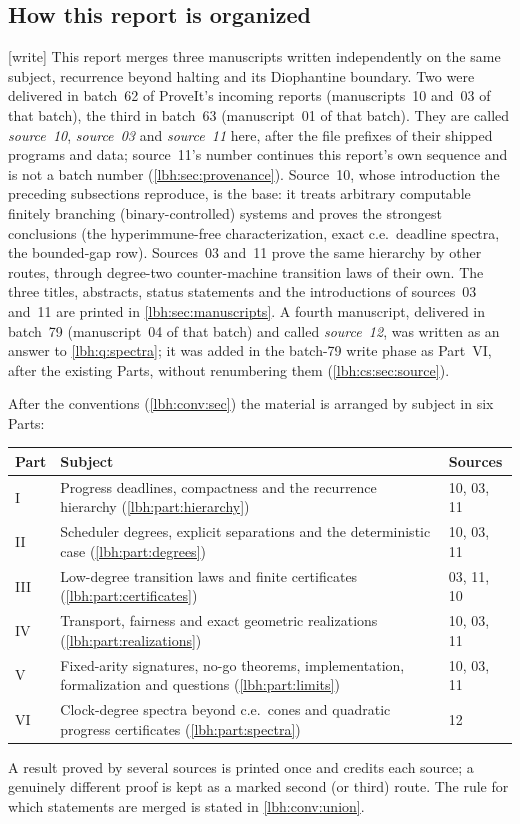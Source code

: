 \documentclass[11pt,letterpaper]{article}
\theoremstyle{definition}
\theoremstyle{remark}
\newcommand{\1}{\mathbf 1}
\newcommand{\wtag}{\textup{[write]}}%
\begin{document}
\subsection{How this report is organized}\label{lbh:sec:organization}
\wtag{} This report merges three manuscripts written independently on the same subject,
recurrence beyond halting and its Diophantine boundary. Two were delivered in batch~62 of
ProveIt's incoming reports (manuscripts~10 and~03 of that batch), the third in batch~63
(manuscript~01 of that batch). They are called \emph{source~10}, \emph{source~03} and
\emph{source~11} here, after the file prefixes of their shipped programs and data; source~11's
number continues this report's own sequence and is not a batch number
(\cref{lbh:sec:provenance}). Source~10, whose introduction the preceding subsections
reproduce, is the base: it treats arbitrary computable finitely branching (binary-controlled)
systems and proves the strongest conclusions (the hyperimmune-free characterization, exact
c.e.\ deadline spectra, the bounded-gap row). Sources~03 and~11 prove the same hierarchy by
other routes, through degree-two counter-machine transition laws of their own. The three titles,
abstracts, status statements and the introductions of sources~03 and~11 are printed in
\cref{lbh:sec:manuscripts}. A fourth manuscript, delivered in batch~79 (manuscript~04 of that
batch) and called \emph{source~12}, was written as an answer to \cref{lbh:q:spectra}; it was added
in the batch-79 write phase as Part~VI, after the existing Parts, without renumbering them
(\cref{lbh:cs:sec:source}).

After the conventions (\cref{lbh:conv:sec}) the material is arranged by subject in six Parts:
\begin{center}
\small
\begin{tabularx}{\textwidth}{@{}lXl@{}}
\toprule
Part & Subject & Sources\\
\midrule
I & Progress deadlines, compactness and the recurrence hierarchy (\cref{lbh:part:hierarchy}) & 10, 03, 11\\
II & Scheduler degrees, explicit separations and the deterministic case (\cref{lbh:part:degrees}) & 10, 03, 11\\
III & Low-degree transition laws and finite certificates (\cref{lbh:part:certificates}) & 03, 11, 10\\
IV & Transport, fairness and exact geometric realizations (\cref{lbh:part:realizations}) & 10, 03, 11\\
V & Fixed-arity signatures, no-go theorems, implementation, formalization and questions (\cref{lbh:part:limits}) & 10, 03, 11\\
VI & Clock-degree spectra beyond c.e.\ cones and quadratic progress certificates (\cref{lbh:part:spectra}) & 12\\
\bottomrule
\end{tabularx}
\end{center}
A result proved by several sources is printed once and credits each source; a genuinely
different proof is kept as a marked second (or third) route. The rule for which statements are
merged is stated in \cref{lbh:conv:union}.
\end{document}
